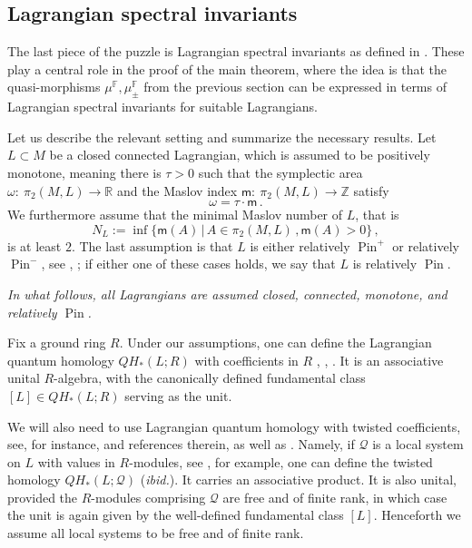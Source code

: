 \documentclass[11pt%
]{article}
\theoremstyle{definition}
\newcommand{\R}{{\mathbb{R}}}
\newcommand{\F}{{\mathbb{F}}}
\newcommand{\Z}{{\mathbb{Z}}}
\newcommand{\cQ}{{\mathcal{Q}}}
\newcommand{\fc}{{:\ }}
\DeclareMathOperator{\Pin}{Pin}
\DeclareMathOperator{\0}{\operatorname{\mathbf{0}}}
\begin{document}
\subsection{Lagrangian spectral invariants}

The last piece of the puzzle is Lagrangian spectral invariants as defined in \cite{leclercq2018spectral}. These play a central role in the proof of the main theorem, where the idea is that the quasi-morphisms $\mu^\F,\mu^\F_\pm$ from the previous section can be expressed in terms of Lagrangian spectral invariants for suitable Lagrangians.

Let us describe the relevant setting and summarize the necessary results. Let $L\subset M$ be a closed connected Lagrangian, which is assumed to be positively monotone, meaning there is $\tau > 0$ such that the symplectic area $\omega \fc \pi_2(M,L)\to \R$ and the Maslov index $\mathsf m \fc \pi_2(M,L) \to \Z$ satisfy
$$\omega = \tau\cdot \mathsf m\,.$$
We furthermore assume that the minimal Maslov number of $L$, that is
$$N_L:=\inf \{\mathsf m(A) \,|\, A\in \pi_2(M,L)\,,\mathsf m(A) > 0\}\,,$$
is at least $2$. The last assumption is that $L$ is either relatively $\Pin^+$ or relatively $\Pin^-$, see \cite{Solomon_Intersection_Thry_Moduli_Space_Holo_Curves_Lag_Bd_Cond}, \cite{Wehrheim_Woodward_Orientations_Quilts}; if either one of these cases holds, we say that $L$ is relatively $\Pin$.

\begin{center}
  \emph{In what follows, all Lagrangians are assumed closed, connected, monotone, and relatively $\Pin$.}
\end{center}

Fix a ground ring $R$. Under our assumptions, one can define the Lagrangian quantum homology $QH_*(L;R)$ with coefficients in $R$ \cite{biran2007quantum}, \cite{Biran_Cornea_Lag_Top_Enumerative_Geom}, \cite{Zapolsky_Orientations}. It is an associative unital $R$-algebra, with the canonically defined fundamental class $[L] \in QH_*(L;R)$ serving as the unit.

We will also need to use Lagrangian quantum homology with twisted coefficients, see, for instance, \cite{Biran_Cornea_Lag_Top_Enumerative_Geom} and references therein, as well as \cite{Zapolsky_Orientations}. Namely, if $\cQ$ is a local system on $L$ with values in $R$-modules, see \cite{Zapolsky_Orientations}, for example, one can define the twisted homology $QH_*(L;\cQ)$ (\emph{ibid.}). It carries an associative product. It is also unital, provided the $R$-modules comprising $\cQ$ are free and of finite rank, in which case the unit is again given by the well-defined fundamental class $[L]$. Henceforth we assume all local systems to be free and of finite rank.
\end{document}
